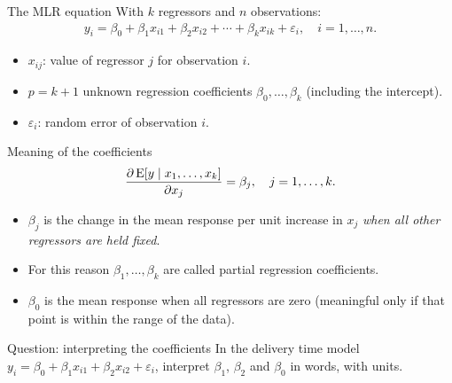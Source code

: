 \begin{frame}{The MLR equation}
    With $k$ regressors and $n$ observations:
    \begin{align}
        y_i = \beta_0 + \beta_1 x_{i1} + \beta_2 x_{i2} + \cdots + \beta_k x_{ik} + \varepsilon_i, \quad i=1,\dots,n. \label{eq:mlr-scalar}
    \end{align}
    \begin{itemize}
        \item $x_{ij}$: value of regressor $j$ for observation $i$.
        \item $p = k+1$ unknown regression coefficients $\beta_0,\dots,\beta_k$ (including the intercept).
        \item $\varepsilon_i$: random error of observation $i$.
    \end{itemize}
\end{frame}


\begin{frame}{Meaning of the coefficients}
    \[
    \frac{\partial \operatorname{E}[y\mid x_1,\dots,x_k]}{\partial x_j} = \beta_j, \quad j=1,\dots,k.
    \]
    \begin{itemize}
        \item $\beta_j$ is the change in the mean response per unit increase in $x_j$ \emph{when all other regressors are held fixed}.
        \item For this reason $\beta_1,\dots,\beta_k$ are called partial regression coefficients.
        \item $\beta_0$ is the mean response when all regressors are zero (meaningful only if that point is within the range of the data).
    \end{itemize}
\end{frame}


\begin{frame}{Question: interpreting the coefficients}
    In the delivery time model $y_i = \beta_0 + \beta_1 x_{i1} + \beta_2 x_{i2} + \varepsilon_i$, interpret $\beta_1$, $\beta_2$ and $\beta_0$ in words, with units.

\end{frame}


